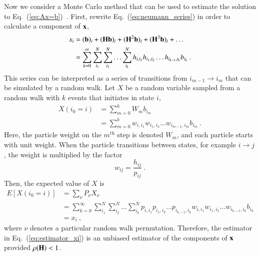 \documentclass[preprint,12pt]{elsarticle}
\newcommand{\vb}{\ensuremath{\ve{b}}}
\newcommand{\vx}{\ensuremath{\ve{x}}}
\newcommand{\vH}{\ensuremath{\ve{H}}}
\begin{document}
Now we consider a Monte Carlo method that can be used to estimate the solution
to Eq.~(\ref{eq:Ax=b})~\cite{hammersley_1964}.  First, rewrite
Eq.~(\ref{eq:neumann_series}) in order to calculate a component of
$\vx$,
\begin{equation}
  \begin{split}
    x_i &= (\vb)_i + (\vH\vb)_i + (\vH^2\vb)_i + (\vH^3\vb)_i +
    \ldots\\
    &= \sum_{k=0}^{\infty}\sum_{i_1}^{N}\sum_{i_2}^{N}\ldots
    \sum_{i_k}^{N}h_{i,i_1}h_{i_1,i_2}\ldots h_{i_{k-1},i_k}b_{i_k}\:.
  \end{split}
  \label{eq:neumann_series_i}
\end{equation}
This series can be interpreted as a series of transitions from
$i_{m-1}\rightarrow i_m$ that can be simulated by a random walk.
Let $X$ be a random variable sampled from a random walk with $k$
events that initiates in state $i$,
\begin{equation}
  \begin{split}
    X(i_0 = i) &= \sum_{m=0}^{k}W_m b_{i_m}\\
    &= \sum_{m=0}^{k}w_{i,i_1}w_{i_1,i_2}\ldots
    w_{i_{m-1},i_m}b_{i_m}\:.
  \end{split}
  \label{eq:estimator_xi}
\end{equation}
Here, the particle weight on the $m^\text{th}$ step is denoted $W_m$,
and each particle starts with unit weight. When the particle
transitions between states, for example $i\rightarrow j$, the weight
is multiplied by the factor
\begin{equation}
  w_{ij} = \frac{h_{ij}}{p_{ij}}\:.
  \label{eq:weight}
\end{equation}
Then, the expected value of $X$ is
\begin{equation}
  \begin{split}
    E[X(i_0=i)] &= \sum_{\nu}P_\nu X_\nu\\
    &= \sum_{k=0}^{\infty}\sum_{i_1}^{N}\sum_{i_2}^{N}\ldots
    \sum_{i_k}^{N}p_{i,i_1}p_{i_1,i_2}\ldots p_{i_{k-1},i_k}
    w_{i,i_1}w_{i_1,i_2}\dots w_{i_{k-1},i_k}b_{i_k}\\
    &= x_i\:,
  \end{split}
  \label{eq:expectation_xi}
\end{equation}
where $\nu$ denotes a particular random walk permutation.
Therefore, the estimator in Eq.~(\ref{eq:estimator_xi}) is an unbiased
estimator of the components of $\vx$ provided $\rho(\vH) < 1$.
\end{document}
